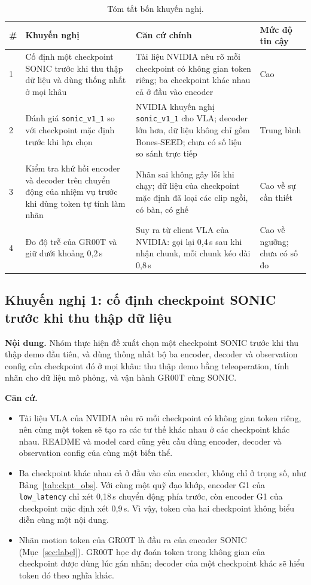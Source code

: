 \documentclass[12pt,a4paper,oneside]{report}
\newcommand{\code}[1]{\texttt{#1}}
\begin{document}
\begin{table}[htbp]
\centering\footnotesize
\caption[Tóm tắt bốn khuyến nghị]{Tóm tắt bốn khuyến nghị.}
\label{tab:recommend}
\begin{tabular}{L{0.4cm}L{4.6cm}L{6.4cm}L{2.6cm}}
\toprule
\textbf{\#} & \textbf{Khuyến nghị} & \textbf{Căn cứ chính} & \textbf{Mức độ tin cậy}\\
 & Cố định một checkpoint SONIC trước khi thu thập dữ liệu và dùng thống nhất ở mọi khâu & Tài liệu NVIDIA nêu rõ mỗi checkpoint có không gian token riêng; ba checkpoint khác nhau cả ở đầu vào encoder & Cao\\
2 & Đánh giá \code{sonic\_v1\_1} so với checkpoint mặc định trước khi lựa chọn & NVIDIA khuyến nghị \code{sonic\_v1\_1} cho VLA; decoder lớn hơn, dữ liệu không chỉ gồm Bones-SEED; chưa có số liệu so sánh trực tiếp & Trung bình\\
3 & Kiểm tra khứ hồi encoder và decoder trên chuyển động của nhiệm vụ trước khi dùng token tự tính làm nhãn & Nhãn sai không gây lỗi khi chạy; dữ liệu của checkpoint mặc định đã loại các clip ngồi, có bàn, có ghế & Cao về sự cần thiết\\
4 & Đo độ trễ của GR00T và giữ dưới khoảng 0,2\,s & Suy ra từ client VLA của NVIDIA: gọi lại 0,4\,s sau khi nhận chunk, mỗi chunk kéo dài 0,8\,s & Cao về ngưỡng; chưa có số đo\\
\bottomrule
\end{tabular}
\end{table}

\subsection{Khuyến nghị 1: cố định checkpoint SONIC trước khi thu thập dữ liệu}
\label{sec:rec_ckpt}

\textbf{Nội dung.} Nhóm thực hiện đề xuất chọn một checkpoint SONIC trước khi thu thập demo đầu tiên, và dùng thống nhất bộ ba encoder, decoder và observation config của checkpoint đó ở mọi khâu: thu thập demo bằng teleoperation, tính nhãn cho dữ liệu mô phỏng, và vận hành GR00T cùng SONIC.

\textbf{Căn cứ.}
\begin{itemize}
\item Tài liệu VLA của NVIDIA nêu rõ mỗi checkpoint có không gian token riêng, nên cùng một token sẽ tạo ra các tư thế khác nhau ở các checkpoint khác nhau. README và model card cũng yêu cầu dùng encoder, decoder và observation config của cùng một biến thể.
\item Ba checkpoint khác nhau cả ở đầu vào của encoder, không chỉ ở trọng số, như Bảng~\ref{tab:ckpt_obs}. Với cùng một quỹ đạo khớp, encoder G1 của \code{low\_latency} chỉ xét 0,18\,s chuyển động phía trước, còn encoder G1 của checkpoint mặc định xét 0,9\,s. Vì vậy, token của hai checkpoint không biểu diễn cùng một nội dung.
\item Nhãn motion token của GR00T là đầu ra của encoder SONIC (Mục~\ref{sec:label}). GR00T học dự đoán token trong không gian của checkpoint được dùng lúc gán nhãn; decoder của một checkpoint khác sẽ hiểu token đó theo nghĩa khác.
\end{itemize}
\end{document}

